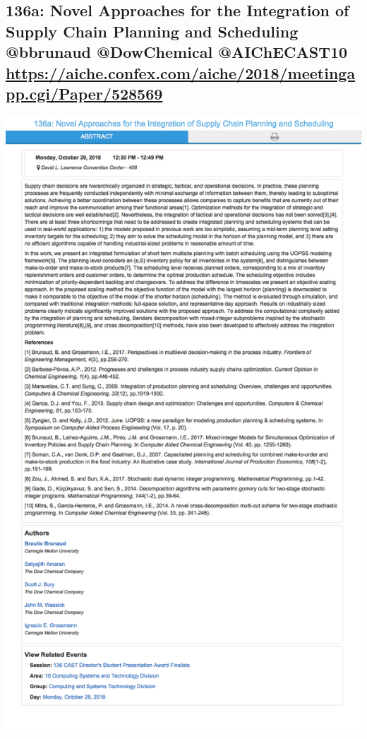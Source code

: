 \documentclass[11pt]{article}
\begin{document}
\subsection{136a: Novel Approaches for the Integration of Supply Chain Planning and Scheduling @bbrunaud  @DowChemical @AIChECAST10 \url{https://aiche.confex.com/aiche/2018/meetingapp.cgi/Paper/528569}}
\label{sec:orga9e108f}
\begin{center}
\includegraphics[width=.9\linewidth]{./528569.png}
\end{center}
\end{document}
